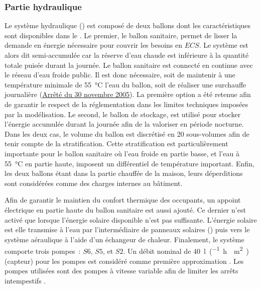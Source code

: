 \subsubsection{Partie hydraulique} %
\label{ssub:partie_hyraulique}
Le système hydraulique () est composé de deux ballons dont les
caractéristiques sont disponibles dans le . Le premier, le ballon
sanitaire, permet de lisser la demande en énergie nécessaire pour couvrir les besoins en
$ECS$. Le système est alors dit semi-accumulée car la réserve d’eau chaude est inférieure
à la quantité totale puisée durant la journée. Le ballon sanitaire est connecté en
continue avec le réseau d’eau froide public. Il est donc nécessaire, soit de maintenir
à une température minimale de \SI{55}{\celsius} l’eau du ballon, soit de réaliser une surchauffe journalière
(\href{https://www.legifrance.gouv.fr/affichTexte.do?cidTexte=JORFTEXT000000423756}{Arrêté
du 30 novembre 2005}). La première option a été retenue afin de garantir le respect de la
réglementation dans les limites techniques imposées par la modélisation. Le second, le
ballon de stockage, est utilisé pour stocker l’énergie accumulée durant la journée afin de
la valoriser en période nocturne. Dans les deux cas, le volume du ballon est discrétisé en
\num{20} sous-volumes afin de tenir compte de la stratification. Cette stratification est
particulièrement importante pour le ballon sanitaire où l’eau froide en partie basse, et
l’eau à \SI{55}{\celsius} en partie haute, imposent un différentiel de température
important. Enfin, les deux ballons étant dans la partie chauffée de la maison, leurs
déperditions sont considérées comme des charges internes au bâtiment.

Afin de garantir le maintien du confort thermique des occupants, un appoint électrique en
partie haute du ballon sanitaire est aussi ajouté. Ce dernier n’est activé que lorsque
l’énergie solaire disponible n’est pas suffisante. L’énergie solaire est elle transmise à
l’eau par l’intermédiaire de panneaux solaires () puis vers le
système aéraulique à l’aide d’un échangeur de chaleur. Finalement, le système comporte trois
pompes~: $S6$, $S5$, et $S2$. Un débit nominal de \SI{40}{\litre\per(\hour\period\meter\squared)}
(capteur) pour les pompes est considéré comme première approximation
\parencite{Peuser2005}. Les pompes utilisées sont des pompes à vitesse variable afin de
limiter les arrêts intempestifs \parencite{Kicsiny20123489}.

